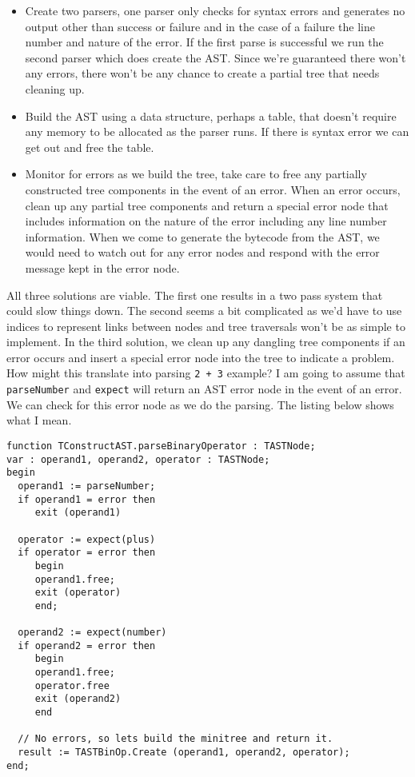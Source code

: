 \begin{itemize}
  \item Create two parsers, one parser only checks for syntax errors and generates no output other than success or failure and in the case of a failure the line number and nature of the error. If the first parse is successful we run the second parser which does create the AST. Since we're guaranteed there won't any errors, there won't be any chance to create a partial tree that needs cleaning up.
  \item Build the AST using a data structure, perhaps a table, that doesn't require any memory to be allocated as the parser runs. If there is syntax error we can get out and free the table.
  \item Monitor for errors as we build the tree, take care to free any partially constructed tree components in the event of an error. When an error occurs, clean up any partial tree components and return a special error node that includes information on the nature of the error including any line number information. When we come to generate the bytecode from the AST, we would need to watch out for any error nodes and respond with the error message kept in the error node.
\end{itemize}

All three solutions are viable. The first one results in a two pass system that could slow things down. The second seems a bit complicated as we'd have to use indices to represent links between nodes and tree traversals won't be as simple to implement. In the third solution, we clean up any dangling tree components if an error occurs and insert a special error node into the tree to indicate a problem. How might this translate into parsing {\tt 2 + 3} example? I am going to assume that {\tt parseNumber} and {\tt expect} will return an AST error node in the event of an error. We can check for this error node as we do the parsing.  The listing below shows what I mean.

\begin{lstlisting}
function TConstructAST.parseBinaryOperator : TASTNode;
var : operand1, operand2, operator : TASTNode;
begin
  operand1 := parseNumber;
  if operand1 = error then
     exit (operand1)

  operator := expect(plus)
  if operator = error then
     begin
     operand1.free;
     exit (operator)
     end;

  operand2 := expect(number)
  if operand2 = error then
     begin
     operand1.free;
     operator.free
     exit (operand2)
     end

  // No errors, so lets build the minitree and return it.
  result := TASTBinOp.Create (operand1, operand2, operator);
end;
\end{lstlisting}

